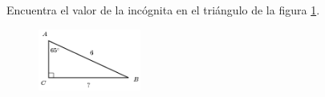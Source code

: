 Encuentra el valor de la incógnita en el triángulo de la figura \ref{fig:lados_functrig_04}.
\begin{figure}[H]
    \begin{center}
        \includegraphics[width=0.3\textwidth]{../images/lados_functrig_04.png}
    \end{center}
    \caption{}
    \label{fig:lados_functrig_04}
\end{figure}